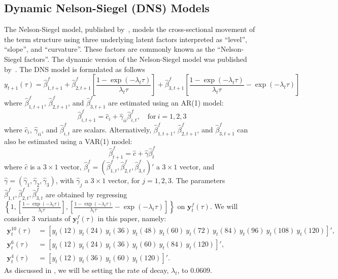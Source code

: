 \subsection{Dynamic Nelson-Siegel (DNS) Models}
\label{sec:dns}
The Nelson-Siegel model, published by~\textcite{Nelson1987}, models the cross-sectional movement of the term structure using three underlying latent factors interpreted as \enquote{level}, \enquote{slope}, and \enquote{curvature}. These factors are commonly known as the \enquote{Nelson-Siegel factors}. The dynamic version of the Nelson-Siegel model was published by~\textcite[hereafter DNS]{Diebold2006}. The DNS model is formulated as follows
\begin{equation}
	y_{t+1}(\tau) = \hat{\beta}_{1,t+1}^{f} + \hat{\beta}_{2,t+1}^{f} \left[\frac{1-\exp(-\lambda_t \tau)}{\lambda_t \tau}\right] + \hat{\beta}_{3,t+1}^{f} \left[\frac{1-\exp(-\lambda_t \tau)}{\lambda_t \tau} - \exp(-\lambda_t \tau)\right]
\end{equation}
where $\hat{\beta}_{1,t+1}^{f}$, $\hat{\beta}_{2,t+1}^{f}$, and $\hat{\beta}_{3,t+1}^{f}$ are estimated using an AR(1) model:
\begin{equation}
\label{eq:dnsar}
	\hat{\beta}_{i,t+1}^{f} = \hat{c}_i + \hat{\gamma}_{ii} \hat{\beta}_{i,t}^f, \quad \text{for}~i = 1,2,3
\end{equation}
where $\hat{c}_i$, $\hat{\gamma}_{ii}$, and $\hat{\beta}_{i,t}^f$ are scalars. Alternatively, $\hat{\beta}_{1,t+1}^{f}$, $\hat{\beta}_{2,t+1}^{f}$, and $\hat{\beta}_{3,t+1}^{f}$ can also be estimated using a VAR(1) model:
\begin{equation}
\label{eq:dnsvar}
	\hat{\beta}_{t+1}^{f} = \hat{c} + \hat{\gamma} \hat{\beta}_t^f
\end{equation}
where $\hat{c}$ is a $3 \times 1$ vector, $\hat{\beta}_t^f = \left(\hat{\beta}_{1,t}^f, \hat{\beta}_{2,t}^f, \hat{\beta}_{3,t}^f\right)'$ a $3 \times 1$ vector, and $\hat{\gamma} = \left(\hat{\gamma}_1, \hat{\gamma}_2, \hat{\gamma}_3 \right)$, with $\hat{\gamma}_j$ a $3 \times 1$ vector, for $j = 1,2,3$. The parameters $\hat{\beta}_{1,t}^f, \hat{\beta}_{2,t}^f, \hat{\beta}_{3,t}^f$ are obtained by regressing $\left\{1, \left[\frac{1-\exp(-\lambda_t \tau)}{\lambda_t \tau}\right], \left[\frac{1-\exp(-\lambda_t \tau)}{\lambda_t \tau} - \exp(-\lambda_t \tau)\right] \right\}$ on $\mathbf{y}_t^f(\tau)$. We will consider 3 variants of $\mathbf{y}_t^f(\tau)$ in this paper, namely:
\begin{align*}
	\mathbf{y}_t^{10}(\tau) &= \left[y_t(12)~y_t(24)~y_t(36)~y_t(48)~y_t(60)~y_t(72)~y_t(84)~y_t(96)~y_t(108)~y_t(120) \right]', \\
	\mathbf{y}_t^6(\tau) &= \left[y_t(12)~y_t(24)~y_t(36)~y_t(60)~y_t(84)~y_t(120) \right]', \\
	\mathbf{y}_t^4(\tau) &= \left[y_t(12)~y_t(36)~y_t(60)~y_t(120) \right]'.
\end{align*}
As discussed in \textcite{Diebold2006}, we will be setting the rate of decay, $\lambda_t$, to $0.0609$.

